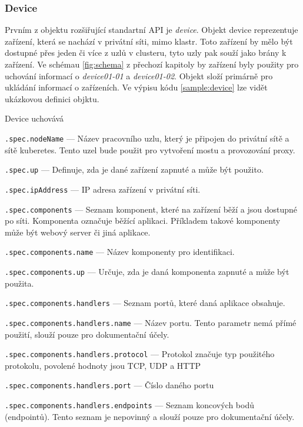 \subsubsection{Device}
Prvním z objektu rozšiřující standartní API je \textit{device}. Objekt device reprezentuje zařízení, která se nachází v privátní síti, mimo klastr. Toto zařízení by mělo být dostupné přes jeden či více z uzlů v clusteru, tyto uzly pak souží jako brány k zařízení. Ve schémau \ref{fig:schema} z přechozí kapitoly by zařízení byly použity pro uchování informací o \textit{device01-01} a \textit{device01-02}. Objekt složí primárně pro ukládání informací o zařízeních. Ve výpisu kódu \ref{sample:device} lze vidět ukázkovou definici objktu.

Device uchovává 
\begin{description}
    \item \verb|.spec.nodeName| --- Název pracovního uzlu, který je připojen do privátní sítě a sítě kuberetes. Tento uzel bude použit pro vytvoření mostu a provozování proxy.
    \item \verb|.spec.up| --- Definuje, zda je dané zařízení zapnuté a může být použito.
    \item \verb|.spec.ipAddress| --- IP adresa zařízení v privátní síti.
    \item \verb|.spec.components| --- Seznam komponent, které na zařízení běží a jsou dostupné po síti. Komponenta označuje běžící aplikaci. Příkladem takové komponenty může být webový server či jiná aplikace.  
    \item \verb|.spec.components.name| --- Název komponenty pro identifikaci.
    \item \verb|.spec.components.up| --- Určuje, zda je daná komponenta zapnuté a může být použita.
    \item \verb|.spec.components.handlers| --- Seznam portů, které daná aplikace obsahuje.
    \item \verb|.spec.components.handlers.name| --- Název portu. Tento parametr nemá přímé použití, slouží pouze pro dokumentační účely. 
    \item \verb|.spec.components.handlers.protocol| --- Protokol značuje typ použitého protokolu, povolené hodnoty jsou TCP, UDP a HTTP
    \item \verb|.spec.components.handlers.port| --- Číslo daného portu
    \item \verb|.spec.components.handlers.endpoints| --- Seznam koncových bodů (endpointů). Tento seznam je nepovinný a slouží pouze pro dokumentační účely.
\end{description}

